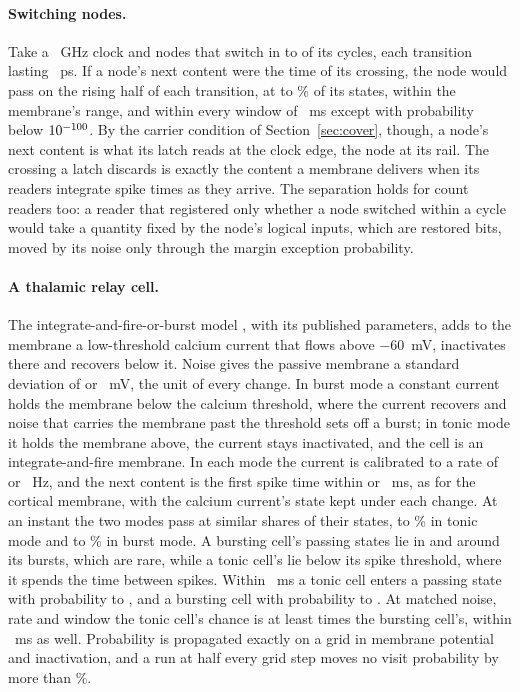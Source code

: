 \documentclass[12pt]{article}
\begin{document}
\paragraph{Switching nodes.} Take a \uSwClockGHz{}~GHz clock and nodes that
switch in \uSwActivityLow{} to \uSwActivityHigh{} of its cycles, each transition
lasting \uSwTransitionPs{}~ps. If a node's next content were the time of its
crossing, the node would pass on the rising half of each transition, at
\uSwNodePassMinPercent{} to \uSwNodePassMaxPercent\% of its states, within the
membrane's range, and within every window of \uOccContentShortMs{}~ms except with
probability below $10^{-100}$. By the carrier condition of
Section~\ref{sec:cover}, though, a node's next content is what its latch reads
at the clock edge, the node at its rail. The crossing a latch discards is
exactly the content a membrane delivers when its readers integrate spike times
as they arrive. The separation holds for count readers too: a reader that
registered only whether a node switched within a cycle would take a quantity
fixed by the node's logical inputs, which are restored bits, moved by its noise
only through the margin exception probability.

\paragraph{A thalamic relay cell.} The integrate-and-fire-or-burst model
\citep{smith2000}, with its published parameters, adds to the membrane a
low-threshold calcium current that flows above $-60$~mV, inactivates there and
recovers below it. Noise gives the passive membrane a standard deviation of
\uRlSigmaLow{} or \uRlSigmaHigh{}~mV, the unit of every change. In burst mode a
constant current holds the membrane below the calcium threshold, where the
current recovers and noise that carries the membrane past the threshold sets
off a burst; in tonic mode it holds the membrane above, the current stays
inactivated, and the cell is an integrate-and-fire membrane. In each mode the
current is calibrated to a rate of \uRlRateLow{} or \uRlRateHigh{}~Hz, and the
next content is the first spike time within \uOccNextShort{} or
\uOccNextLong{}~ms, as for the cortical membrane, with the calcium current's
state kept under each change. At an instant the two modes pass at similar
shares of their states, \uRlTonicPassMinPercent{} to
\uRlTonicPassMaxPercent\% in tonic mode and \uRlBurstPassMinPercent{} to
\uRlBurstPassMaxPercent\% in burst mode. A bursting cell's passing states lie in
and around its bursts, which are rare, while a tonic cell's lie below its spike
threshold, where it spends the time between spikes. Within
\uOccContentLongMs{}~ms a tonic cell enters a passing state with probability
\uRlTonicHitMin{} to \uRlTonicHitMax{}, and a bursting cell with probability
\uRlBurstHitMin{} to \uRlBurstHitMax{}. At matched noise, rate and window the
tonic cell's chance is at least \uRlHitRatioMin{} times the bursting cell's,
within \uOccContentShortMs{}~ms as well. Probability is propagated exactly on a
grid in membrane potential and inactivation, and a run at half every grid step
moves no visit probability by more than \uRlResolutionPercent\%.
\end{document}
